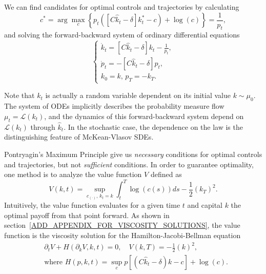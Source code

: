 We can find candidates for optimal controls and trajectories by calculating
\begin{equation*}
    c^* = \arg\max_c  \left\{ p_t\left( \left[C {\hat k_t} - \delta \right]k^*_t - c \right) + \log(c) \right\} = \frac{1}{p_t},
\end{equation*}
and solving the forward-backward system of ordinary differential equations
\begin{equation}\label{economic_example:ode_formulation}
    \begin{cases}
         \dot k_t = \left[ C {\hat k_t} - \delta \right] k_t - \frac{1}{p_t},\\
         \dot p_t = -  \left[C{\hat k_t} - \delta \right] p_t, \\
         k_0 = k,\, p_T =  - k_T.         
    \end{cases}
\end{equation}
\begin{remark}
    Note that $k_t$ is actually a random variable dependent on its initial value $k\sim \mu_0$.
    The system of ODEs implicitly describes the probability measure flow $\mu_t = \mathcal{L}(k_t)$,
    and the dynamics of this forward-backward system depend on $\mathcal{L}(k_t)$ through $\hat k_t$.
    In the stochastic case, the dependence on the law is the distinguishing feature of McKean-Vlasov SDEs.
\end{remark}
    Pontryagin's Maximum Principle give us \textit{necessary} conditions for optimal controls and trajectories, but not \textit{sufficient} conditions.
    In order to guarantee optimality, one method is to analyze the value function $V$ defined as
\begin{equation}\label{economic_example:value_function_definition}
    V(k,t) = \sup_{c_{(\cdot)},\, k_t = k} \int_t^T \log(c(s)) ds -\frac{1}{2}{(k_T)}^2.
\end{equation}
Intuitively, the value function evaluates for a given time $t$ and capital $k$ the optimal payoff from that point forward.
As shown in section~\ref{ADD_APPENDIX_FOR_VISCOSITY_SOLUTIONS}, the value function is the viscosity solution for the Hamilton-Jacobi-Bellman equation
\begin{equation}\label{economic_example:hjb_equation_reduced}
    \begin{split}
        &\partial_t V + H(\partial_k V, k,t) = 0,\quad V(k,T) = -\frac{1}{2}{(k)}^2,\\
        &\text{where }
        H(p,k,t) = \sup_{c} p\left[ \left(C {\hat k_t - \delta}\right)k - c \right] + \log(c).
    \end{split}
\end{equation}
